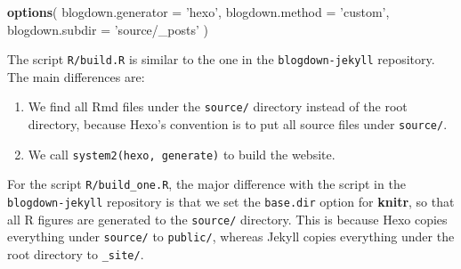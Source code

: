 \documentclass[12pt,]{krantz}
\makeatletter
\newenvironment{Shaded}{\begin{snugshade}}{\end{snugshade}}
\newcommand{\KeywordTok}[1]{\textcolor[rgb]{0.13,0.29,0.53}{\textbf{#1}}}
\newcommand{\DataTypeTok}[1]{\textcolor[rgb]{0.13,0.29,0.53}{#1}}
\newcommand{\StringTok}[1]{\textcolor[rgb]{0.31,0.60,0.02}{#1}}
\newcommand{\NormalTok}[1]{#1}
\newenvironment{kframe}{%
\medskip{}
\setlength{\fboxsep}{.8em}
 \def\at@end@of@kframe{}%
 \ifinner\ifhmode%
  \def\at@end@of@kframe{\end{minipage}}%
  \begin{minipage}{\columnwidth}%
 \fi\fi%
 \def\FrameCommand##1{\hskip\@totalleftmargin \hskip-\fboxsep
 \colorbox{shadecolor}{##1}\hskip-\fboxsep
     \hskip-\linewidth \hskip-\@totalleftmargin \hskip\columnwidth}%
 \MakeFramed {\advance\hsize-\width
   \@totalleftmargin\z@ \linewidth\hsize
   \@setminipage}}%
 {\par\unskip\endMakeFramed%
 \at@end@of@kframe}
\renewenvironment{Shaded}{\begin{kframe}}{\end{kframe}}
\theoremstyle{definition}
\theoremstyle{definition}
\theoremstyle{definition}
\theoremstyle{remark}
\makeatother
\begin{document}
\begin{Shaded}
\begin{Highlighting}[]
\KeywordTok{options}\NormalTok{(}
  \DataTypeTok{blogdown.generator =} \StringTok{'hexo'}\NormalTok{,}
  \DataTypeTok{blogdown.method =} \StringTok{'custom'}\NormalTok{,}
  \DataTypeTok{blogdown.subdir =} \StringTok{'source/_posts'}
\NormalTok{)}
\end{Highlighting}
\end{Shaded}

The script \texttt{R/build.R} is similar to the one in the
\texttt{blogdown-jekyll} repository. The main differences are:

\begin{enumerate}
\def\labelenumi{\arabic{enumi}.}
\item
  We find all Rmd files under the \texttt{source/} directory instead of
  the root directory, because Hexo's convention is to put all source
  files under \texttt{source/}.
\item
  We call
  \texttt{system2(\textquotesingle{}hexo\textquotesingle{},\ \textquotesingle{}generate\textquotesingle{})}
  to build the website.
\end{enumerate}

For the script \texttt{R/build\_one.R}, the major difference with the
script in the \texttt{blogdown-jekyll} repository is that we set the
\texttt{base.dir} option for \textbf{knitr}, so that all R figures are
generated to the \texttt{source/} directory. This is because Hexo copies
everything under \texttt{source/} to \texttt{public/}, whereas Jekyll
copies everything under the root directory to \texttt{\_site/}.
\end{document}
